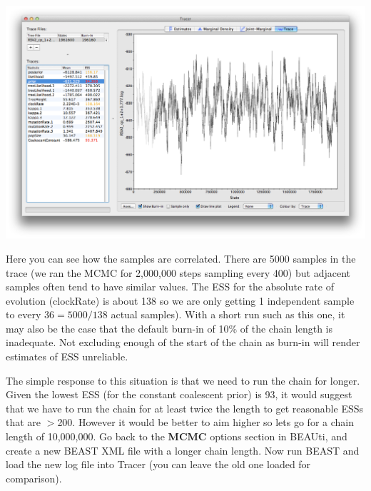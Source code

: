 \documentclass[12pt]{article}
\begin{document}
\includegraphics[width=\textwidth]{figures/Tracer1}

\medskip{}

Here you can see how the samples are correlated. There are 5000 samples in the trace (we ran the MCMC for 2,000,000
steps sampling every 400) but adjacent samples often tend to have similar values. The ESS for the absolute rate of evolution (clockRate) is about 138 so we are only getting 1 independent sample to every $36=5000/138$ actual samples). With a short run such as this one, it may also be the case that the default burn-in of 10\% of the chain length is inadequate. Not excluding enough of the start of the chain as burn-in will render estimates of ESS unreliable.

The simple response to this situation is that we need to run the chain for longer. Given the lowest ESS (for the constant coalescent prior) is 93, it
would suggest that we have to run the chain for at least twice the length to get reasonable ESSs that are $>$200. However it would be better to aim
higher so lets go for a chain length of 10,000,000. Go back to the {\bf MCMC} options section in BEAUti, and create a new BEAST
XML file with a longer chain length. Now run BEAST and load the new log file into Tracer (you can leave the old one loaded
for comparison). 
\end{document}
